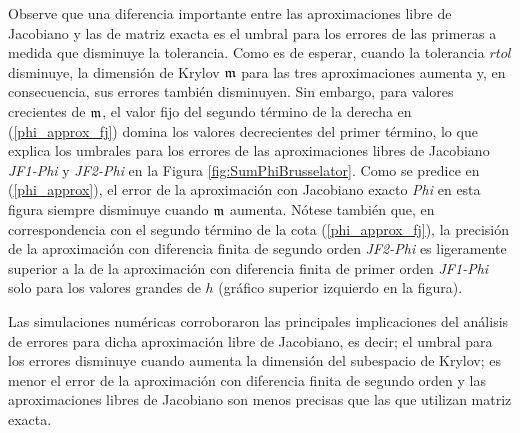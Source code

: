 Observe que una diferencia importante entre las aproximaciones libre de Jacobiano y las de matriz exacta es el umbral para los errores de las primeras a medida que disminuye la tolerancia. Como es de esperar, cuando la tolerancia $rtol$ disminuye, la dimensión de Krylov $\mathfrak{m}$ para las tres aproximaciones aumenta y, en consecuencia, sus errores también disminuyen. Sin embargo, para valores crecientes de $\mathfrak{m}$, el valor fijo del segundo término de la derecha en (\ref{phi_approx_fj}) domina los valores decrecientes del primer término, lo que explica los umbrales para los errores de las aproximaciones libres de Jacobiano \textit{JF1-Phi} y \textit{JF2-Phi} en la Figura \ref{fig:SumPhiBrusselator}. Como se predice en (\ref{phi_approx}), el error de la aproximación con Jacobiano exacto \textit{Phi} en esta figura siempre disminuye cuando $\mathfrak{m}$ aumenta. Nótese también que, en correspondencia con el segundo término de la cota (\ref{phi_approx_fj}), la precisión de la aproximación con diferencia finita de segundo orden \textit{JF2-Phi} es ligeramente superior a la de la aproximación con diferencia finita de primer orden \textit{JF1-Phi} solo para los valores grandes de $h$ (gráfico superior izquierdo en la figura).

Las simulaciones numéricas corroboraron las principales implicaciones del análisis de errores para dicha aproximación libre de Jacobiano, es decir; el umbral para los errores disminuye cuando aumenta la dimensión del subespacio de Krylov; es menor el error de la aproximación con diferencia finita de segundo orden y  las aproximaciones libres de Jacobiano son menos precisas que las que utilizan matriz exacta.